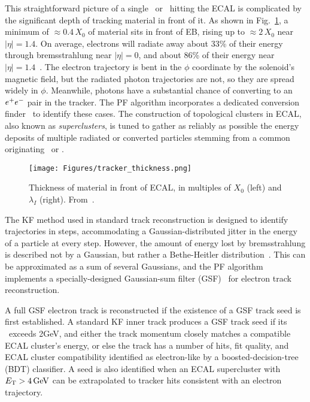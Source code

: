 This straightforward picture of a single \Pe\ or \Pgamma\ hitting the ECAL is complicated by the significant depth of tracking material in front of it.
As shown in Fig.~\ref{fig:tracker_thickness}, a minimum of ${\approx}0.4$\,$X_{0}$ of material sits in front of EB, rising up to ${\approx}2$\,$X_{0}$ near $|\eta| = 1.4$.
On average, electrons will radiate away about 33\% of their energy through bremsstrahlung near $|\eta| = 0$, and about 86\% of their energy near $|\eta| = 1.4$~\cite{ref:1748-0221/10/06/P06005}.
The electron trajectory is bent in the $\phi$ coordinate by the solenoid's magnetic field, but the radiated photon trajectories are not, so they are spread widely in $\phi$.
Meanwhile, photons have a substantial chance of converting to an $\Pe^{+}\Pe^{-}$ pair in the tracker. The PF algorithm incorporates a dedicated conversion
finder~\cite{ref:1748-0221/10/08/P08010} to identify these cases. The construction of topological clusters in ECAL, also known as \textit{superclusters}, is tuned
to gather as reliably as possible the energy deposits of multiple radiated or converted particles stemming from a common originating \Pe\ or \Pgamma.

\begin{figure}[hbtp]
  \begin{center}
    \texttt{[image: Figures/tracker\_thickness.png]}
    \caption{
    Thickness of material in front of ECAL, in multiples of $X_{0}$ (left) and $\lambda_{I}$ (right). From~\cite{ref:1748-0221/9/10/P10009}.
    }
    \label{fig:tracker_thickness}
  \end{center}
\end{figure}

The KF method used in standard track reconstruction is designed to identify trajectories in steps, accommodating a Gaussian-distributed
jitter in the energy of a particle at every step. However, the amount of energy lost by bremsstrahlung is described not by a Gaussian, but rather a Bethe-Heitler distribution~\cite{ref:rspa.1934.0140}.
This can be approximated as a sum of several Gaussians, and the PF algorithm implements a specially-designed Gaussian-sum filter (GSF)~\cite{ref:0954-3899/31/9/N01}
for electron track reconstruction.

A full GSF electron track is reconstructed if the existence of a GSF track seed is first established.
A standard KF inner track produces a GSF track seed if its \pT\ exceeds 2\unit{GeV}, and either
the track momentum closely matches a compatible ECAL cluster's energy, or else the track has a number of hits, fit quality, and ECAL cluster compatibility
identified as electron-like by a boosted-decision-tree (BDT) classifier. A seed is also identified when an ECAL supercluster with $\ET > 4\unit{GeV}$
can be extrapolated to tracker hits consistent with an electron trajectory.

